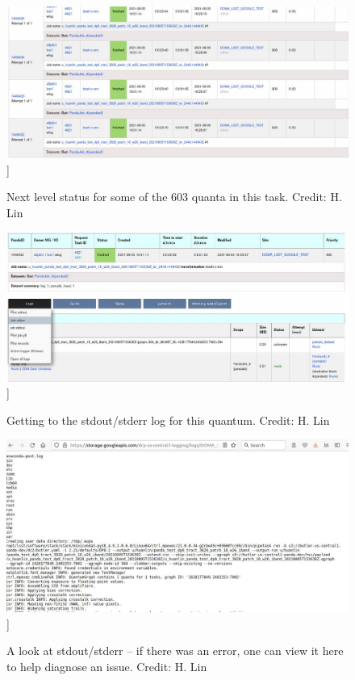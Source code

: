 \documentclass[DM,authoryear,toc]{lsstdoc}
\begin{document}
\begin{figure}
\includegraphics[width=\textwidth]{tasks5.jpg}]
\caption{Next level status for some of the 603 quanta in this task.
Credit: H. Lin}
\end{figure}

\begin{figure}
\includegraphics[width=\textwidth]{log0.jpg}]
\caption{Getting to the stdout/stderr log for this quantum. 
Credit: H. Lin}
\end{figure}

\begin{figure}
\includegraphics[width=\textwidth]{log1.jpg}]
\caption{A look at stdout/stderr -- if there was an error, one can view it here to help diagnose an issue.
Credit: H. Lin}
\end{figure}
\end{document}
